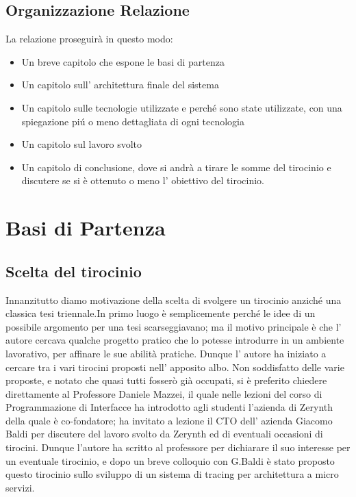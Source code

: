 \documentclass[a4paper,12pt,titlepage,italian,openany]{report}
\begin{document}
\section{Organizzazione Relazione}
La relazione proseguirà in questo modo:
\begin{itemize}
    \item Un breve capitolo che espone le basi di partenza
    \item Un capitolo sull' architettura finale del sistema
    \item Un capitolo sulle tecnologie utilizzate e perché sono state utilizzate, con una spiegazione piú o meno dettagliata di ogni tecnologia
    \item Un capitolo sul lavoro svolto 
    \item Un capitolo di conclusione, dove si andrà a tirare le somme del tirocinio e discutere se si è ottenuto o meno l' obiettivo del tirocinio.
\end{itemize}



\chapter{Basi di Partenza}
\section{Scelta del tirocinio}
Innanzitutto diamo motivazione della scelta di svolgere un tirocinio anziché una classica tesi triennale.In primo luogo è semplicemente perché le idee di un possibile argomento
per una tesi scarseggiavano; ma il motivo principale è che l' autore cercava qualche progetto pratico che lo potesse introdurre in un ambiente lavorativo, per affinare le sue abilità pratiche. Dunque l' autore ha iniziato a cercare tra i vari tirocini proposti nell' apposito albo. Non soddisfatto delle varie proposte, e notato che quasi tutti fosserò già occupati, si è preferito chiedere direttamente al Professore Daniele Mazzei, il quale nelle lezioni del corso di Programmazione di Interfacce ha introdotto agli studenti l'azienda di Zerynth della quale è co-fondatore; ha invitato a lezione 
il CTO dell' azienda Giacomo Baldi per discutere del lavoro svolto da Zerynth ed di eventuali occasioni di tirocini. Dunque l'autore ha scritto al professore per dichiarare il suo interesse per un eventuale tirocinio, e dopo un breve colloquio con G.Baldi è stato proposto questo tirocinio sullo sviluppo di un sistema di tracing per architettura a micro servizi.
\end{document}
